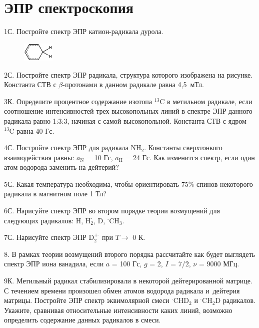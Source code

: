 \setmainfont{Noto Serif}
\setsansfont{Noto Sans}
\setmonofont{Noto Sans Mono}

\section{ЭПР спектроскопия}
1С. Постройте спектр ЭПР катион-радикала дурола.
\par
\begin{figure} %
   \centering
    \vspace{-3.6ex}
    \includegraphics[width=15mm]{images/Fig_2_7_1.png}
    \vspace{-4ex}
\end{figure}
2С. Постройте спектр ЭПР радикала, структура которого изображена на рисунке. Константа СТВ с $\beta$-протонами в данном радикале равна 4,5~мТл.
\par
3К. Определите процентное содержание изотопа $^{13}\text{C}$ в метильном радикале, если соотношение интенсивностей трех высокопольных линий в спектре ЭПР данного радикала равно 1:3:3, начиная с самой высокопольной. Константа СТВ с ядром $^{13}\text{C}$ равна 40 Гс.
\par
4С. Постройте спектр ЭПР для радикала $\text{NH}_2^{\boldsymbol{\cdot}}$. Константы сверхтонкого взаимодействия равны: $a_{\text{N}}$ = 10 Гс, $a_{\text{H}}$ = 24 Гс. Как изменится спектр, если один атом водорода заменить на дейтерий?
\par
5С. Какая температура необходима, чтобы ориентировать 75\% спинов некоторого радикала в магнитном поле 1 Тл?
\par
6С. Нарисуйте спектр ЭПР во втором порядке теории возмущений для следующих радикалов: $\text{H}$, $\text{H}_2^{\boldsymbol{\cdot}}$, $\text{D}$, $^{\boldsymbol{\cdot}}\text{CH}_3$.
\par
7С. Нарисуйте спектр ЭПР $\text{D}_2^{+\boldsymbol{\cdot}}$ при $T \rightarrow$ 0 К.
\par
8. В рамках теории возмущений второго порядка рассчитайте как будет выглядеть спектр ЭПР иона ванадила, если $a$ = 100 Гс, $g$ = 2, $I$ = 7/2, $\nu$ = 9000 МГц.
\par
9К. Метильный радикал стабилизировали в некоторой дейтерированной матрице. С течением времени произошел обмен атомов водорода радикала и~дейтерия матрицы. Постройте ЭПР спектр эквимолярной смеси $^{\boldsymbol{\cdot}}\text{CHD}_2$ и $^{\boldsymbol{\cdot}}\text{CH}_2\text{D}$ радикалов. Укажите, сравнивая относительные интенсивности каких линий, возможно определить содержание данных радикалов в смеси.
